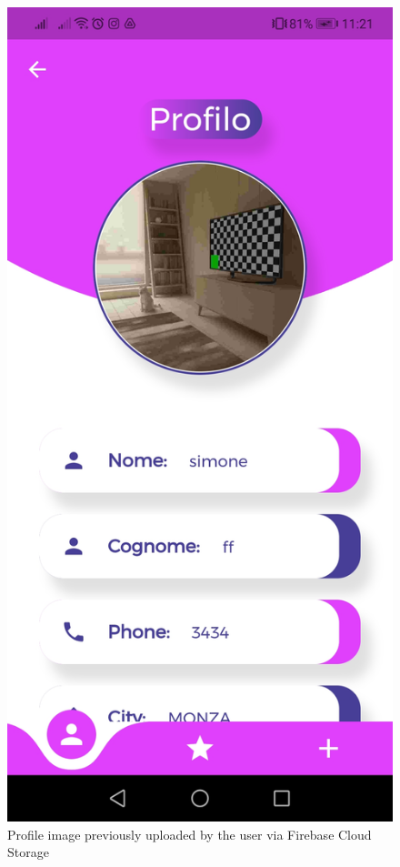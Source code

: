 \documentclass[../../dd.tex]{subfiles}
\begin{document}
    \begin{figure}[H]
        \centering
        \includegraphics[scale=0.2]{../../assets/fcs.jpg}
        \caption{Profile image previously uploaded by the user via Firebase Cloud Storage}\label{fig:widget-tests}
    \end{figure}
    
\end{document}
